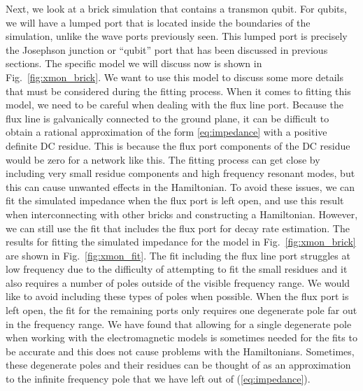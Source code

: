 Next, we look at a brick simulation that contains a transmon qubit. For qubits, we will have a lumped port that is located inside the boundaries of the simulation, unlike the wave ports previously seen. This lumped port is precisely the Josephson junction or ``qubit'' port that has been discussed in previous sections. The specific model we will discuss now is shown in Fig.\ \ref{fig:xmon_brick}. We want to use this model to discuss some more details that must be considered during the fitting process. When it comes to fitting this model, we need to be careful when dealing with the flux line port. Because the flux line is galvanically connected to the ground plane, it can be difficult to obtain a rational approximation of the form \ref{eq:impedance} with a positive definite DC residue. This is because the flux port components of the DC residue would be zero for a network like this. The fitting process can get close by including very small residue components and high frequency resonant modes, but this can cause unwanted effects in the Hamiltonian. To avoid these issues, we can fit the simulated impedance when the flux port is left open, and use this result when interconnecting with other bricks and constructing a Hamiltonian. However, we can still use the fit that includes the flux port for decay rate estimation. The results for fitting the simulated impedance for the model in Fig.\ \ref{fig:xmon_brick} are shown in Fig.\ \ref{fig:xmon_fit}. The fit including the flux line port struggles at low frequency due to the difficulty of attempting to fit the small residues and it also requires a number of poles outside of the visible frequency range. We would like to avoid including these types of poles when possible. When the flux port is left open, the fit for the remaining ports only requires one degenerate pole far out in the frequency range. We have found that allowing for a single degenerate pole when working with the electromagnetic models is sometimes needed for the fits to be accurate and this does not cause problems with the Hamiltonians. Sometimes, these degenerate poles and their residues can be thought of as an approximation to the infinite frequency pole that we have left out of (\ref{eq:impedance}).
